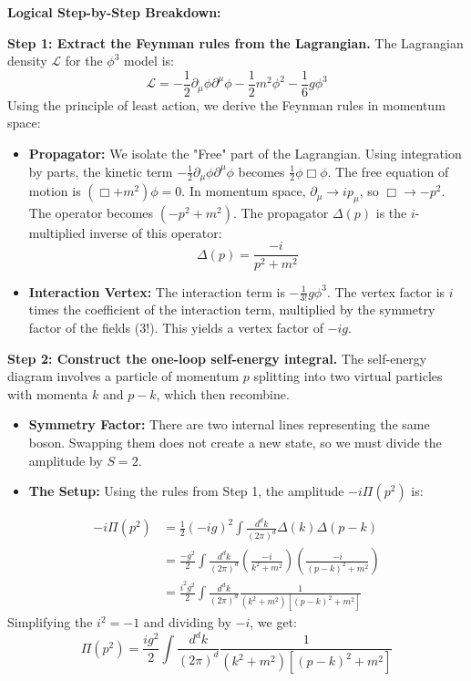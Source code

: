 \begin{solution}
\textbf{Logical Step-by-Step Breakdown:}

\textbf{Step 1: Extract the Feynman rules from the Lagrangian.}
The Lagrangian density $\mathcal{L}$ for the $\phi^3$ model is:
\begin{equation*}
    \mathcal{L} = -\frac{1}{2} \partial_\mu \phi \partial^\mu \phi - \frac{1}{2} m^2 \phi^2 - \frac{1}{6} g \phi^3
\end{equation*}
Using the principle of least action, we derive the Feynman rules in momentum space:
\begin{itemize}
    \item \textbf{Propagator:} We isolate the "Free" part of the Lagrangian. Using integration by parts, the kinetic term $-\frac{1}{2}\partial_\mu \phi \partial^\mu \phi$ becomes $\frac{1}{2}\phi \Box \phi$. The free equation of motion is $(\Box + m^2)\phi = 0$. In momentum space, $\partial_\mu \to ip_\mu$, so $\Box \to -p^2$. The operator becomes $(-p^2 + m^2)$. The propagator $\Delta(p)$ is the $i$-multiplied inverse of this operator:
    \begin{equation*}
        \Delta(p) = \frac{-i}{p^2 + m^2}
    \end{equation*}
    \item \textbf{Interaction Vertex:} The interaction term is $-\frac{1}{3!} g \phi^3$. The vertex factor is $i$ times the coefficient of the interaction term, multiplied by the symmetry factor of the fields ($3!$). This yields a vertex factor of \textbf{$-ig$}.
\end{itemize}

\textbf{Step 2: Construct the one-loop self-energy integral.}
The self-energy diagram involves a particle of momentum $p$ splitting into two virtual particles with momenta $k$ and $p-k$, which then recombine.
\begin{itemize}
    \item \textbf{Symmetry Factor:} There are two internal lines representing the same boson. Swapping them does not create a new state, so we must divide the amplitude by $S = 2$.
    \item \textbf{The Setup:} Using the rules from Step 1, the amplitude $-i\Pi(p^2)$ is:
\end{itemize}
\begin{align*}
    -i\Pi(p^2) &= \frac{1}{2} (-ig)^2 \int \frac{d^d k}{(2\pi)^d} \Delta(k) \Delta(p-k) \\
    &= \frac{-g^2}{2} \int \frac{d^d k}{(2\pi)^d} \left( \frac{-i}{k^2 + m^2} \right) \left( \frac{-i}{(p-k)^2 + m^2} \right) \\
    &= \frac{i^2 g^2}{2} \int \frac{d^d k}{(2\pi)^d} \frac{1}{(k^2+m^2)[(p-k)^2+m^2]}
\end{align*}
Simplifying the $i^2 = -1$ and dividing by $-i$, we get:
\begin{equation*}
    \Pi(p^2) = \frac{i g^2}{2} \int \frac{d^d k}{(2\pi)^d} \frac{1}{(k^2+m^2)[(p-k)^2+m^2]}
\end{equation*}


\end{solution}
